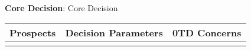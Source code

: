\documentclass{article}
\begin{document}
\noindent
{}
\\

\vspace{0.3cm}
{\hfill}\large{\textbf{Core Decision}: Core Decision}{\hfill}
\vspace{0.17cm}
\noindent
\iffalse

\begin{center}
  \begin{tabular}{|p{}|p{}|p{}|}
    \hline
    \vspace{0.01cm}{\hfill}\textbf{Prospects}{\hfill}\vspace{0.1cm} & \vspace{0.01cm}{\hfill}\textbf{Decision Parameters}{\hfill}\vspace{0.1cm} & \vspace{0.01cm}{\hfill}\textbf{0TD Concerns}{\hfill}\vspace{0.1cm} \\
    \hline
    \vspace{0.1cm}
    \begin{minipage}[t]{0.3\textwidth}
    \end{minipage}
    \vspace{0.1cm} &
    \vspace{0.1cm}
    \begin{minipage}[t]{0.3\textwidth}
    \end{minipage}
    \vspace{0.1cm} &
    \vspace{0.1cm}
    \begin{minipage}[t]{0.3\textwidth}
    \end{minipage}
    \vspace{0.1cm}
    \\
    \hline
  \end{tabular}
\end{center}
\vspace{1cm}
\end{document}
